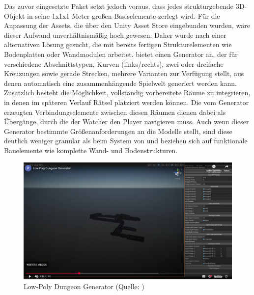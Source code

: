 Das zuvor eingesetzte Paket setzt jedoch voraus, dass jedes strukturgebende \ac{3D}-Objekt in seine 1x1x1 Meter großen Basiselemente zerlegt wird. Für die Anpassung der Assets, die über den Unity Asset Store eingebunden wurden, wäre dieser Aufwand unverhältnismäßig hoch gewesen. Daher wurde nach einer alternativen Lösung gesucht, die mit bereits fertigen Strukturelementen wie Bodenplatten oder Wandmodulen arbeitet. \cite{mysticforge_low_2025} bietet einen Generator an, der für verschiedene Abschnittstypen, Kurven (links/rechts), zwei oder dreifache Kreuzungen sowie gerade Strecken, mehrere Varianten zur Verfügung stellt, aus denen automatisch eine zusammenhängende Spielwelt generiert werden kann. Zusätzlich besteht die Möglichkeit, vollständig vorbereitete Räume zu integrieren, in denen im späteren Verlauf Rätsel platziert werden können. Die vom Generator erzeugten Verbindungselemente zwischen diesen Räumen dienen dabei als Übergänge, durch die der Watcher den Player navigieren muss. Auch wenn dieser Generator bestimmte Größenanforderungen an die Modelle stellt, sind diese deutlich weniger granular als beim System von \cite{alasl_autolevel_2022} und beziehen sich auf funktionale Bauelemente wie komplette Wand- und Bodenstrukturen.

\begin{figure}[ht]
\centering
\includegraphics[width=1\linewidth]{content/pictures/FirstSteps03.png}
\caption{Low-Poly Dungeon Generator (Quelle: \citealp{past12pm_low_2024})}
\label{fig:dungeon-generator}
\end{figure}

